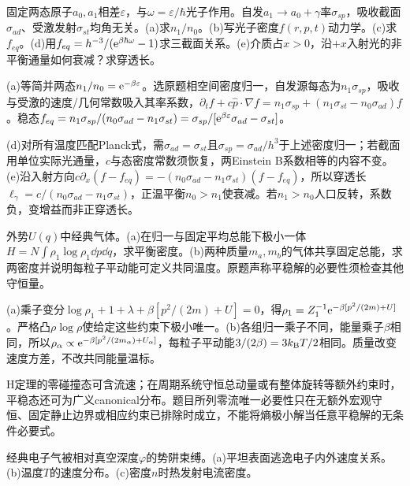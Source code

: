 \begin{exercise}[原题4(a)--(e)]\label{p:333-3-4}
固定两态原子$a_0,a_1$相差$\varepsilon$，与$\omega=\varepsilon/\hbar$光子作用。自发$a_1\to a_0+\gamma$率$\sigma_{sp}$，吸收截面$\sigma_{ad}$、受激发射$\sigma_{st}$均角无关。(a)求$n_1/n_0$。(b)写光子密度$f(r,p,t)$动力学。(c)求$f_{eq}$。(d)用$ f_{eq}=h^{-3}/(\mathrm e^{\beta\hbar\omega}-1)$求三截面关系。(e)介质占$x>0$，沿$+x$入射光的非平衡通量如何衰减？求穿透长。
\end{exercise}
\begin{solution}
(a)等简并两态$n_1/n_0=\mathrm e^{-\beta\varepsilon}$。选原题相空间密度归一，自发源每态为$n_1\sigma_{sp}$，吸收与受激的速度/几何常数吸入其率系数，$\partial_tf+c\hat p\cdot\nabla f=n_1\sigma_{sp}+(n_1\sigma_{st}-n_0\sigma_{ad})f$。稳态$ f_{eq}=n_1\sigma_{sp}/(n_0\sigma_{ad}-n_1\sigma_{st})=\sigma_{sp}/[\mathrm e^{\beta\varepsilon}\sigma_{ad}-\sigma_{st}]$。

(d)对所有温度匹配Planck式，需$\sigma_{ad}=\sigma_{st}$且$\sigma_{sp}=\sigma_{ad}/h^3$于上述密度归一；若截面用单位实际光通量，$c$与态密度常数须恢复，两Einstein B系数相等的内容不变。(e)沿入射方向$c\partial_x(f-f_{eq})=-(n_0\sigma_{ad}-n_1\sigma_{st})(f-f_{eq})$，所以穿透长$\ell_\gamma=c/(n_0\sigma_{ad}-n_1\sigma_{st})$，正温平衡$n_0>n_1$使衰减。若$n_1>n_0$人口反转，系数负，变增益而非正穿透长。
\end{solution}
\begin{exercise}[原题5(a)--(b)]\label{p:333-3-5}
外势$U(q)$中经典气体。(a)在归一与固定平均总能下极小一体$H=N\int\rho_1\log\rho_1\dd p\dd q$，求平衡密度。(b)两种质量$m_a,m_b$的气体共享固定总能，求两密度并说明每粒子平动能可定义共同温度。原题声称平稳解的必要性须检查其他守恒量。
\end{exercise}
\begin{solution}
(a)乘子变分$\log\rho_1+1+\lambda+\beta[p^2/(2m)+U]=0$，得$\rho_1=Z_1^{-1}\mathrm e^{-\beta[p^2/(2m)+U]}$。严格凸$\rho\log\rho$使给定这些约束下极小唯一。(b)各组归一乘子不同，能量乘子$\beta$相同，所以$\rho_\alpha\propto\mathrm e^{-\beta[p^2/(2m_\alpha)+U_\alpha]}$，每粒子平动能$3/(2\beta)=3k_{\mathrm B} T/2$相同。质量改变速度方差，不改共同能量温标。

H定理的零碰撞态可含流速；在周期系统守恒总动量或有整体旋转等额外约束时，平稳态还可为广义canonical分布。题目所列零流唯一必要性只在无额外宏观守恒、固定静止边界或相应约束已排除时成立，不能将熵极小解当任意平稳解的无条件必要式。
\end{solution}
\begin{exercise}[原题6(a)--(c)，选做]\label{p:333-3-6}
经典电子气被相对真空深度$\varphi$的势阱束缚。(a)平坦表面逃逸电子内外速度关系。(b)温度$T$的速度分布。(c)密度$n$时热发射电流密度。
\end{exercise}
